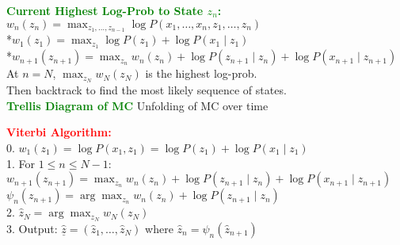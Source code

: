 \documentclass[5pt]{extarticle} %
\begin{document}
\begin{paracol}{3}
{    \textcolor{green}{\textbf{Current Highest Log-Prob to State $z_n$:}} \\
    $w_n(z_n) = \max_{z_1,\ldots,z_{n-1}} \log P(x_1,\ldots,x_n,z_1,\ldots,z_n)$ \\
    *$w_1(z_1) = \max_{z_1} \log P(z_1) + \log P(x_1 \mid z_1)$ \\
    *$w_{n+1}(z_{n+1}) = \max_{z_n} w_n(z_n) + \log P(z_{n+1} \mid z_n) + \log P(x_{n+1} \mid z_{n+1})$ \\

    At $n=N$, $\max_{z_N} w_N(z_N)$ is the highest log-prob. \\
    Then backtrack to find the most likely sequence of states. \\ 
    \textcolor{green}{\textbf{Trellis Diagram of MC}} Unfolding of MC over time 

    \textcolor{red}{\textbf{Viterbi Algorithm:}} \\
    0. $w_1(z_1) = \log P(x_1,z_1) = \log P(z_1) + \log P(x_1 \mid z_1)$ \\
    1. For $1 \leq n \leq N-1$: \\
    $w_{n+1}(z_{n+1}) = \max_{z_n} w_n(z_n) + \log P(z_{n+1} \mid z_n) + \log P(x_{n+1} \mid z_{n+1})$ \\
    $\psi_n(z_{n+1}) = \arg \max_{z_n} w_n(z_n) + \log P(z_{n+1} \mid z_n)$ \\
    2. $\hat{z}_N = \arg \max_{z_N} w_N(z_N)$ \\
    3. Output: $\hat{\underline{z}} = (\hat{z}_1,\ldots,\hat{z}_N)$ where $\hat{z}_n = \psi_n(\hat{z}_{n+1})$ \\



    }
\end{paracol}
\end{document}
